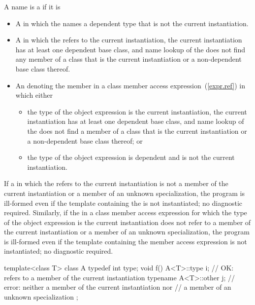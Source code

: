 \pnum
A name is a
if it is

\begin{itemize}
\item 
A
in which the
names a dependent type that is not the current instantiation.

\item A  in which the 
refers to the current instantiation, the current instantiation has at least one
dependent base class, and name lookup of the  does not
find any member of a class that is the current instantiation or a non-dependent
base class thereof.

\item An  denoting the member in a class member access
expression~(\ref{expr.ref}) in which either
\begin{itemize}
\item the type of the object expression is the current instantiation, the
current instantiation has at least one dependent base class, and name lookup
of the  does not find a member of a class that is
the current instantiation or a non-dependent base class thereof; or

\item the type of the object expression is dependent and is not the current
instantiation.
\end{itemize}
\end{itemize}

\pnum
If a  in which the 
refers to the current instantiation is not a member of the current instantiation
or a member of an unknown specialization, the program is ill-formed even if the
template containing the  is not instantiated; no
diagnostic required. Similarly, if the  in a class
member access expression for which the type of the object expression is the
current instantiation does not refer to a member of the current instantiation
or a member of an unknown specialization, the program is ill-formed even if the
template containing the member access expression is not instantiated; no diagnostic
required. \enterexample
\begin{codeblock}
template<class T> class A {
  typedef int type;
  void f() {
    A<T>::type i;           // OK: refers to a member of the current instantiation
    typename A<T>::other j; // error: neither a member of the current instantiation nor
                            // a member of an unknown specialization
  }
};
\end{codeblock}
\exitexample

